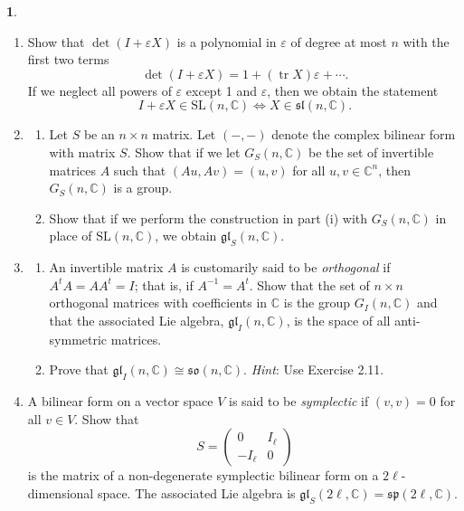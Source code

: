 \documentclass[12pt]{article}
\DeclareMathOperator{\tr}{tr}
\newcommand{\gl}{\mathfrak{gl}}
\newcommand{\so}{\mathfrak{so}}
\renewcommand{\sl}{\mathfrak{sl}}
\theoremstyle{definition}
\newtheorem{ex}{}
\begin{document}
\begin{ex}\
	\begin{enumerate}[label=(\roman*)]
		\item Show that $\det(I + \varepsilon X)$ is a polynomial in $\varepsilon$ of degree at most $n$ with the first two terms \begin{equation*}
			      \det(I + \varepsilon X) = 1 + (\tr X)\varepsilon + \cdots.
		      \end{equation*}
		      If we neglect all powers of $\varepsilon$ except 1 and $\varepsilon$, then we obtain the statement \begin{equation*}
			      I + \varepsilon X \in \mathrm{SL}(n, \mathbb{C}) \iff X \in \sl(n, \mathbb{C}).
		      \end{equation*}
		\item \begin{enumerate}[label=(\alph*)]
			      \item Let $S$ be an $n \times n$ matrix.
			            Let $(-,-)$ denote the complex bilinear form with matrix $S$.
			            Show that if we let $G_S(n, \mathbb{C})$ be the set of invertible matrices $A$ such that $(Au, Av) = (u, v)$ for all $u, v \in \mathbb{C}^n$, then $G_S(n, \mathbb{C})$ is a group.
			      \item Show that if we perform the construction in part (i) with $G_S(n, \mathbb{C})$ in place of $\mathrm{SL}(n, \mathbb{C})$, we obtain $\gl_S(n, \mathbb{C})$.
		      \end{enumerate}
		\item \begin{enumerate}[label=(\alph*)]
			      \item An invertible matrix $A$ is customarily said to be \textit{orthogonal} if $A^tA = AA^t = I$; that is, if $A^{-1} = A^t$. Show that the set of $n\times n$ orthogonal matrices with coefficients in $\mathbb{C}$ is the group $G_I(n, \mathbb{C})$ and that the associated Lie algebra, $\gl_I(n, \mathbb{C})$, is the space of all anti-symmetric matrices.
			      \item Prove that $\gl_I(n, \mathbb{C}) \cong \so(n, \mathbb{C})$.
			            \textit{Hint}: Use Exercise 2.11.
		      \end{enumerate}
		\item A bilinear form on a vector space $V$ is said to be \textit{symplectic} if $(v, v) = 0$ for all $v \in V$.
		      Show that \begin{equation*}
			      S= \begin{pmatrix}0 & I_\ell \\ -I_\ell & 0\end{pmatrix}
		      \end{equation*}
		      is the matrix of a non-degenerate symplectic bilinear form on a $2\ell$-dimensional space.
		      The associated Lie algebra is $\gl_S(2\ell, \mathbb{C}) = \mathfrak{sp}(2\ell, \mathbb{C})$.
	\end{enumerate}
\end{ex}
\end{document}
